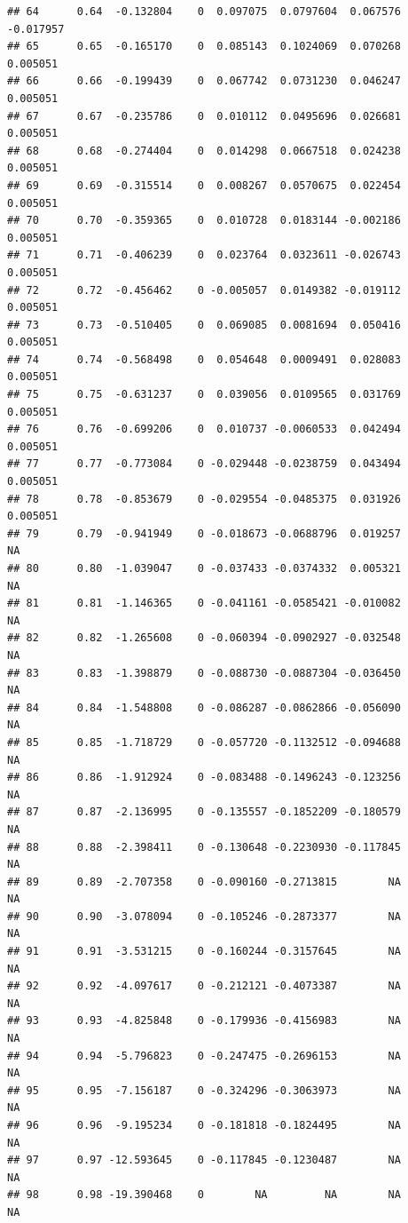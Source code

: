 \documentclass{article}\usepackage[]{graphicx}\usepackage[]{color}
\makeatletter
\newenvironment{kframe}{%
 \def\at@end@of@kframe{}%
 \ifinner\ifhmode%
  \def\at@end@of@kframe{\end{minipage}}%
  \begin{minipage}{\columnwidth}%
 \fi\fi%
 \def\FrameCommand##1{\hskip\@totalleftmargin \hskip-\fboxsep
 \colorbox{shadecolor}{##1}\hskip-\fboxsep
     \hskip-\linewidth \hskip-\@totalleftmargin \hskip\columnwidth}%
 \MakeFramed {\advance\hsize-\width
   \@totalleftmargin\z@ \linewidth\hsize
   \@setminipage}}%
 {\par\unskip\endMakeFramed%
 \at@end@of@kframe}
\newenvironment{knitrout}{}{} %
\makeatother
\begin{document}
\begin{knitrout}
\begin{kframe}
\begin{verbatim}
## 64      0.64  -0.132804    0  0.097075  0.0797604  0.067576   -0.017957
## 65      0.65  -0.165170    0  0.085143  0.1024069  0.070268    0.005051
## 66      0.66  -0.199439    0  0.067742  0.0731230  0.046247    0.005051
## 67      0.67  -0.235786    0  0.010112  0.0495696  0.026681    0.005051
## 68      0.68  -0.274404    0  0.014298  0.0667518  0.024238    0.005051
## 69      0.69  -0.315514    0  0.008267  0.0570675  0.022454    0.005051
## 70      0.70  -0.359365    0  0.010728  0.0183144 -0.002186    0.005051
## 71      0.71  -0.406239    0  0.023764  0.0323611 -0.026743    0.005051
## 72      0.72  -0.456462    0 -0.005057  0.0149382 -0.019112    0.005051
## 73      0.73  -0.510405    0  0.069085  0.0081694  0.050416    0.005051
## 74      0.74  -0.568498    0  0.054648  0.0009491  0.028083    0.005051
## 75      0.75  -0.631237    0  0.039056  0.0109565  0.031769    0.005051
## 76      0.76  -0.699206    0  0.010737 -0.0060533  0.042494    0.005051
## 77      0.77  -0.773084    0 -0.029448 -0.0238759  0.043494    0.005051
## 78      0.78  -0.853679    0 -0.029554 -0.0485375  0.031926    0.005051
## 79      0.79  -0.941949    0 -0.018673 -0.0688796  0.019257          NA
## 80      0.80  -1.039047    0 -0.037433 -0.0374332  0.005321          NA
## 81      0.81  -1.146365    0 -0.041161 -0.0585421 -0.010082          NA
## 82      0.82  -1.265608    0 -0.060394 -0.0902927 -0.032548          NA
## 83      0.83  -1.398879    0 -0.088730 -0.0887304 -0.036450          NA
## 84      0.84  -1.548808    0 -0.086287 -0.0862866 -0.056090          NA
## 85      0.85  -1.718729    0 -0.057720 -0.1132512 -0.094688          NA
## 86      0.86  -1.912924    0 -0.083488 -0.1496243 -0.123256          NA
## 87      0.87  -2.136995    0 -0.135557 -0.1852209 -0.180579          NA
## 88      0.88  -2.398411    0 -0.130648 -0.2230930 -0.117845          NA
## 89      0.89  -2.707358    0 -0.090160 -0.2713815        NA          NA
## 90      0.90  -3.078094    0 -0.105246 -0.2873377        NA          NA
## 91      0.91  -3.531215    0 -0.160244 -0.3157645        NA          NA
## 92      0.92  -4.097617    0 -0.212121 -0.4073387        NA          NA
## 93      0.93  -4.825848    0 -0.179936 -0.4156983        NA          NA
## 94      0.94  -5.796823    0 -0.247475 -0.2696153        NA          NA
## 95      0.95  -7.156187    0 -0.324296 -0.3063973        NA          NA
## 96      0.96  -9.195234    0 -0.181818 -0.1824495        NA          NA
## 97      0.97 -12.593645    0 -0.117845 -0.1230487        NA          NA
## 98      0.98 -19.390468    0        NA         NA        NA          NA

\end{verbatim}
\end{kframe}
\end{knitrout}
\end{document}
